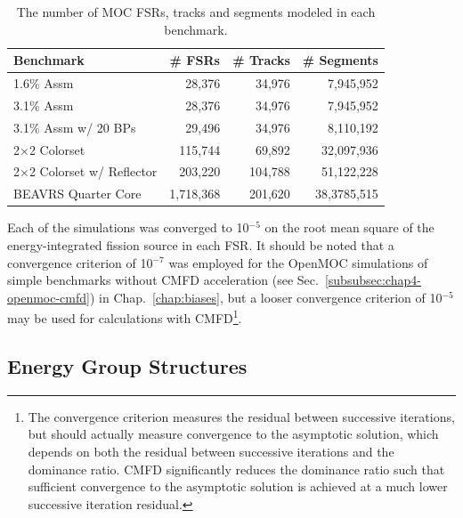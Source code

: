 \begin{table}[h!]
  \centering
  \caption[Number of \ac{FSR}s, tracks and segments for each heterogeneous benchmark]{The number of \ac{MOC} \ac{FSR}s, tracks and segments modeled in each benchmark.}
  \small
  \label{table:chap8-num-fsrs-tracks-segments}
  \vspace{6pt}
  \begin{tabular}{l r r r}
  \toprule
  \rowcolor{lightgray}
  \textbf{Benchmark} &
  \multicolumn{1}{c}{\cellcolor{lightgray} \textbf{\# \ac{FSR}s}} &
  \multicolumn{1}{c}{\cellcolor{lightgray} \textbf{\# Tracks}} &
  \multicolumn{1}{c}{\cellcolor{lightgray} \textbf{\# Segments}} \\
  \midrule
1.6\% Assm & 28,376 & 34,976 & 7,945,952 \\
  \midrule
3.1\% Assm & 28,376 & 34,976 & 7,945,952 \\
  \midrule
3.1\% Assm w/ 20 BPs & 29,496 & 34,976 & 8,110,192  \\
  \midrule
2$\times$2 Colorset & 115,744 & 69,892 & 32,097,936 \\
  \midrule
2$\times$2 Colorset w/ Reflector & 203,220 & 104,788 & 51,122,228 \\
  \midrule
\ac{BEAVRS} Quarter Core & 1,718,368 & 201,620 & 38,3785,515 \\
  \bottomrule
\end{tabular}
\end{table}

Each of the simulations was converged to 10$^{-5}$ on the root mean square of the energy-integrated fission source in each \ac{FSR}. It should be noted that a convergence criterion of 10$^{-7}$ was employed for the OpenMOC simulations of simple benchmarks without \ac{CMFD} acceleration (see Sec.~\ref{subsubsec:chap4-openmoc-cmfd}) in Chap.~\ref{chap:biases}, but a looser convergence criterion of 10$^{-5}$ may be used for calculations with \ac{CMFD}\footnote{The convergence criterion measures the residual between successive iterations, but should actually measure convergence to the asymptotic solution, which depends on both the residual between successive iterations and the dominance ratio. \ac{CMFD} significantly reduces the dominance ratio such that sufficient convergence to the asymptotic solution is achieved at a much lower successive iteration residual.}.

\subsection{Energy Group Structures}
\label{subsec:chap8-energy-groups}


